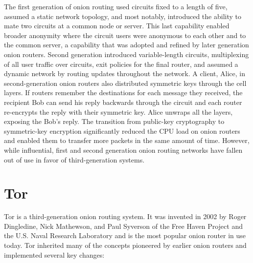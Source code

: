 The first generation of onion routing used circuits fixed to a length of five, assumed a static network topology, and most notably, introduced the ability to mate two circuits at a common node or server. This last capability enabled broader anonymity where the circuit users were anonymous to each other and to the common server, a capability that was adopted and refined by later generation onion routers. Second generation introduced variable-length circuits, multiplexing of all user traffic over circuits, exit policies for the final router, and assumed a dynamic network by routing updates throughout the network. A client, Alice, in second-generation onion routers also distributed symmetric keys through the cell layers. If routers remember the destinations for each message they received, the recipient Bob can send his reply backwards through the circuit and each router re-encrypts the reply with their symmetric key. Alice unwraps all the layers, exposing the Bob's reply. The transition from public-key cryptography to symmetric-key encryption significantly reduced the CPU load on onion routers and enabled them to transfer more packets in the same amount of time. However, while influential, first and second generation onion routing networks have fallen out of use in favor of third-generation systems.\cite{syverson2011peel} 

\section{Tor}

Tor is a third-generation onion routing system. It was invented in 2002 by Roger Dingledine, Nick Mathewson, and Paul Syverson of the Free Haven Project and the U.S. Naval Research Laboratory\cite{dingledine2004tor} and is the most popular onion router in use today. Tor inherited many of the concepts pioneered by earlier onion routers and implemented several key changes:\cite{syverson2011peel}\cite{dingledine2004tor}

